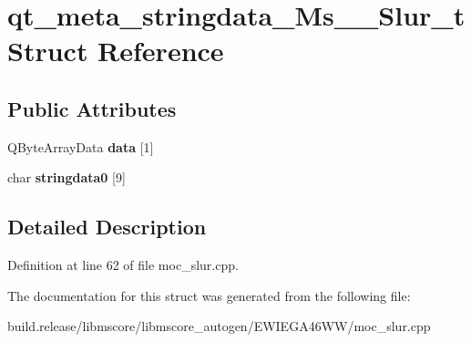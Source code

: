 \hypertarget{structqt__meta__stringdata___ms_____slur__t}{}\section{qt\+\_\+meta\+\_\+stringdata\+\_\+\+Ms\+\_\+\+\_\+\+Slur\+\_\+t Struct Reference}
\label{structqt__meta__stringdata___ms_____slur__t}
\subsection*{Public Attributes}
\begin{DoxyCompactItemize}
\item 
\mbox{\label{structqt__meta__stringdata___ms_____slur__t_af1ff3f9c53076b5b7a4ecc6ae895f04f}} 
Q\+Byte\+Array\+Data {\bfseries data} \mbox{[}1\mbox{]}
\item 
\mbox{\label{structqt__meta__stringdata___ms_____slur__t_a80479dfa86c09faabb87146aa0f0edaa}} 
char {\bfseries stringdata0} \mbox{[}9\mbox{]}
\end{DoxyCompactItemize}


\subsection{Detailed Description}


Definition at line 62 of file moc\+\_\+slur.\+cpp.



The documentation for this struct was generated from the following file\+:\begin{DoxyCompactItemize}
\item 
build.\+release/libmscore/libmscore\+\_\+autogen/\+E\+W\+I\+E\+G\+A46\+W\+W/moc\+\_\+slur.\+cpp\end{DoxyCompactItemize}
